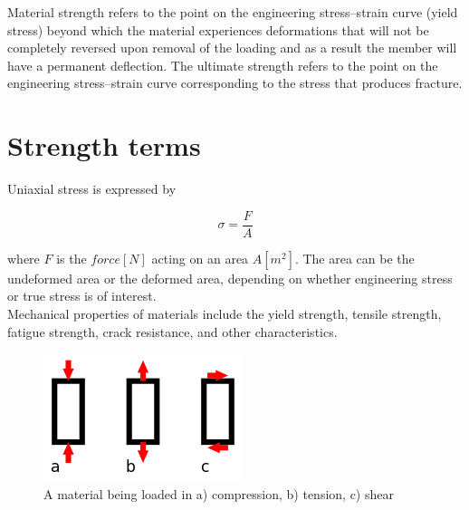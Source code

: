 Material strength refers to the point on the engineering stress–strain curve (yield stress) beyond which the material experiences deformations that will not be completely reversed upon removal of the loading and as a result the member will have a permanent deflection. The ultimate strength refers to the point on the engineering stress–strain curve corresponding to the stress that produces fracture.

\section{Strength terms}
Uniaxial stress is expressed by

\begin{equation}\label{eq: uniaxial stress}
\sigma ={\frac{F}{A}}
\end{equation} 

where $ F $ is the $ force [N] $ acting on an area $ A [m^2] $. The area can be the undeformed area or the deformed area, depending on whether engineering stress or true stress is of interest.\\

Mechanical properties of materials include the yield strength, tensile strength, fatigue strength, crack resistance, and other characteristics. \\

\begin{figure}[h!]
\centering
\includegraphics[width=0.3\linewidth]{figure/Compressive_tensile_shear_loading}
\caption{A material being loaded in a) compression, b) tension, c) shear}
\label{fig:compressivetensileshearloading}
\end{figure}

